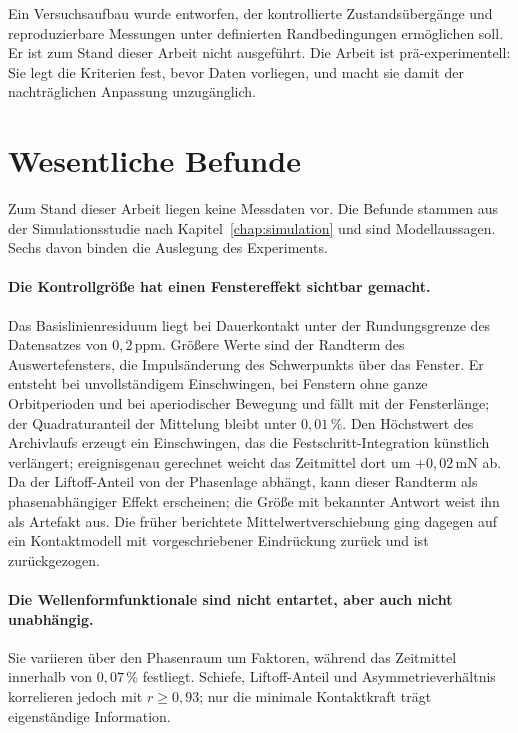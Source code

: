 \documentclass[12pt,a4paper]{report}
\begin{document}
Ein Versuchsaufbau wurde entworfen, der kontrollierte Zustandsübergänge
und reproduzierbare Messungen unter definierten Randbedingungen
ermöglichen soll. Er ist zum Stand dieser Arbeit nicht ausgeführt. Die
Arbeit ist prä-experimentell: Sie legt die Kriterien fest, bevor Daten
vorliegen, und macht sie damit der nachträglichen Anpassung
unzugänglich.

\section{Wesentliche Befunde}
\label{sec:befunde}

Zum Stand dieser Arbeit liegen keine Messdaten vor. Die Befunde stammen
aus der Simulationsstudie nach Kapitel~\ref{chap:simulation} und sind
Modellaussagen. Sechs davon binden die Auslegung des Experiments.

\paragraph{Die Kontrollgröße hat einen Fenstereffekt sichtbar
gemacht.} Das Basislinienresiduum liegt bei Dauerkontakt unter der
Rundungsgrenze des Datensatzes von $0{,}2\,\mathrm{ppm}$. Größere Werte
sind der Randterm des
Auswertefensters, die Impulsänderung des Schwerpunkts über das Fenster.
Er entsteht bei unvollständigem Einschwingen, bei Fenstern ohne ganze
Orbitperioden und bei aperiodischer Bewegung und fällt mit der
Fensterlänge; der Quadraturanteil der Mittelung bleibt unter
$0{,}01\,\%$. Den Höchstwert des Archivlaufs erzeugt ein Einschwingen,
das die Festschritt-Integration künstlich verlängert; ereignisgenau
gerechnet weicht das Zeitmittel dort um $+0{,}02\,\mathrm{mN}$ ab. Da der
Liftoff-Anteil von der Phasenlage abhängt, kann dieser Randterm als
phasenabhängiger Effekt erscheinen; die Größe mit bekannter Antwort weist
ihn als Artefakt aus. Die früher berichtete Mittelwertverschiebung ging
dagegen auf ein Kontaktmodell mit vorgeschriebener Eindrückung zurück und
ist zurückgezogen.

\paragraph{Die Wellenformfunktionale sind nicht entartet, aber auch
nicht unabhängig.} Sie variieren über den Phasenraum um Faktoren,
während das Zeitmittel innerhalb von $0{,}07\,\%$ festliegt. Schiefe,
Liftoff-Anteil und Asymmetrieverhältnis korrelieren jedoch mit
$r \geq 0{,}93$; nur die minimale Kontaktkraft trägt eigenständige
Information.
\end{document}
